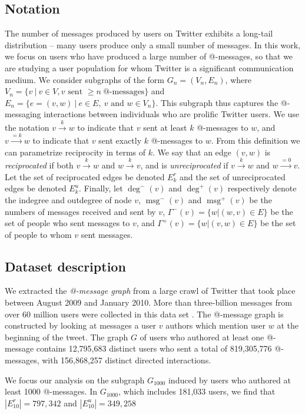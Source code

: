 \documentclass[conference]{IEEEtran}
\begin{document}
\subsection{Notation}
The number of messages produced by users on 
Twitter exhibits a long-tail distribution -- 
many users produce only a small number of messages.
In this work, we focus on users who have produced 
a large number of @-messages, so that we are studying 
a user population for whom Twitter is a significant communication medium.
We consider subgraphs of the form $G_n = (V_n, E_n)$, where $V_n = \{v~|~v \in V, v \text{ sent } \ge n ~ \text{@-messages}\}$ and $E_n = \{e=(v,w)~|~e \in E,~v \text{ and } w \in V_n\}$.
This subgraph thus captures the @-messaging interactions 
between individuals who are prolific Twitter users.
We use the notation $v \xrightarrow{k} w$ to indicate that $v$ sent at least $k$ @-messages to $w$, and $v \xrightarrow{=k} w$ to indicate that $v$ sent exactly $k$ @-messages to $w$. 
From this definition we can parametrize reciprocity in terms of $k$. 
We say that an edge $(v,w)$ is {\em reciprocated} 
if both $v \xrightarrow{k} w$ and $w \xrightarrow{k} v$, and 
is {\em unreciprocated} if $v \xrightarrow{k} w$ and $w \xrightarrow{=0} v$.
Let the set of reciprocated edges be denoted $E_k^r$
and the set of unreciprocated edges be denoted $E_k^u$.
Finally, let $\deg^-(v)$ and $\deg^+(v)$ respectively denote the
indegree and outdegree of node $v$, $\operatorname{msg}^-(v)$ and
$\operatorname{msg}^+(v)$ be the numbers of messages received and sent by $v$,
$\Gamma^-(v) = \{w| (w,v) \in E\}$ be the set of people who sent
messages to $v$, and $\Gamma^+(v) = \{w| (v,w) \in E\}$ be the set of
people to whom $v$ sent messages.

\subsection{Dataset description}
We extracted the \emph{@-message graph} from a large crawl of Twitter that took place between August 2009 and January 2010.  More than three-billion messages from over 60 million users were collected in this data set \cite{Romero:2011:DMI:1963405.1963503}.
The @-message graph is constructed by looking at 
messages a user $v$ authors which mention 
user $w$ at the beginning of the tweet.  
The graph $G$ of users who authored at least one @-message 
contains 12,795,683 distinct users who sent a total 
of 819,305,776 @-messages, with 156,868,257 distinct directed interactions. 

We focus our analysis on the subgraph $G_{1000}$ induced by users who authored at least 1000 @-messages.
In $G_{1000}$, which includes 181,033 users, we find that $|E^r_{10}| = 797,342$ and $|E^u_{10}| = 349,258$
\end{document}
